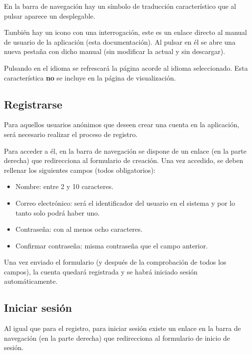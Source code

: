 En la barra de navegación hay un símbolo de traducción característico que al
pulsar aparece un desplegable.

También hay un icono con una interrogación, este es un enlace directo al manual
de usuario de la aplicación (esta documentación). Al pulsar en él se abre una
nueva pestaña con dicho manual (sin modificar la actual y sin descargar).


Pulsando en el idioma se refrescará la página acorde al idioma seleccionado.
Esta característica \textbf{no} se incluye en la página de visualización.

\subsection{Registrarse}

Para aquellos usuarios anónimos que deseen crear una cuenta en la aplicación,
será necesario realizar el proceso de registro.

Para acceder a él, en la barra de navegación se dispone de un enlace (en la
parte derecha) que redirecciona al formulario de creación. Una vez accedido, se
deben rellenar los siguientes campos (todos obligatorios):
\begin{itemize}
    \item Nombre: entre 2 y 10 caracteres.
    \item Correo electrónico: será el identificador del usuario en el sistema y
    por lo tanto solo podrá haber uno.
    \item Contraseña: con al menos ocho caracteres.
    \item Confirmar contraseña: misma contraseña que el campo anterior.
\end{itemize}


Una vez enviado el formulario (y después de la comprobación de todos los
campos), la cuenta quedará registrada y se habrá iniciado sesión
automáticamente.

\subsection{Iniciar sesión}

Al igual que para el registro, para iniciar sesión existe un enlace en la barra
de navegación (en la parte derecha) que redirecciona al formulario de inicio de
sesión.

